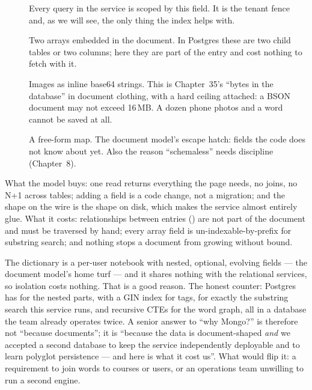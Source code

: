 \begin{description}
  \item[] Every query in the service is scoped by this field. It
  is the tenant fence and, as we will see, the only thing the index
  helps with.
  \item[] Two arrays embedded in the document. In Postgres these
  are two child tables or two  columns; here they are part
  of the entry and cost nothing to fetch with it.
  \item[] Images as inline base64 strings. This is Chapter~35's
  ``bytes in the database'' in document clothing, with a hard ceiling
  attached: a BSON document may not exceed 16\,MB. A dozen phone photos
  and a word cannot be saved at all.
  \item[] A free-form map. The document model's escape hatch:
  fields the code does not know about yet. Also the reason
  ``schemaless'' needs discipline (Chapter~8).
\end{description}

What the model buys: one read returns everything the page needs, no
joins, no N+1 across tables; adding a field is a code change, not a
migration; and the shape on the wire is the shape on disk, which makes
the service almost entirely glue. What it costs: relationships between
entries () are not part of the document and must be
traversed by hand; every array field is un-indexable-by-prefix for
substring search; and nothing stops a document from growing without
bound.

\begin{decision}
The dictionary is a per-user notebook with nested, optional, evolving
fields --- the document model's home turf --- and it shares nothing
with the relational services, so isolation costs nothing. That is a
good reason. The honest counter: Postgres has  for the
nested parts,  with a GIN index for tags,
 for exactly the substring search this service runs, and
recursive CTEs for the word graph, all in a database the team already
operates twice. A senior answer to ``why Mongo?'' is therefore not
``because documents''; it is ``because the data is document-shaped
\emph{and} we accepted a second database to keep the service
independently deployable and to learn polyglot persistence --- and here
is what it cost us''. What would flip it: a requirement to join words
to courses or users, or an operations team unwilling to run a second
engine.
\end{decision}

